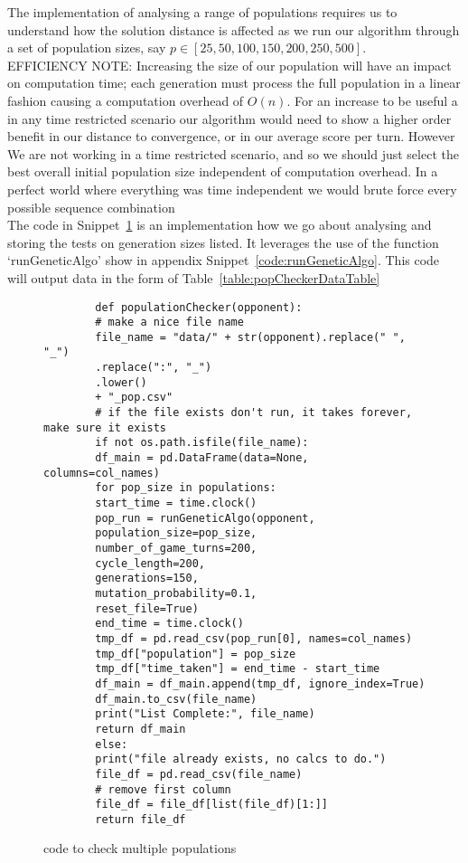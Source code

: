 The implementation of analysing a range of populations requires us to understand how the solution distance is affected as we run our algorithm through a set of population sizes, say \(p \in [25,50,100,150,200,250,500]\).\\

EFFICIENCY NOTE\@: Increasing the size of our population will have an impact on computation time;
each generation must process the full population in a linear fashion causing a computation overhead of \(O(n)\).
For an increase to be useful a in any time restricted scenario our algorithm would need to show a higher order benefit in our distance to convergence, or in our average score per turn.
However We are not working in a time restricted scenario, and so we should just select the best overall initial population size independent of computation overhead.
In a perfect world where everything was time independent we would brute force every possible sequence combination\\

The code in Snippet~\ref{code:populationChecker} is an implementation how we go about analysing and storing the tests on generation sizes listed.
It leverages the use of the function `runGeneticAlgo' show in appendix Snippet~\ref{code:runGeneticAlgo}.
This code will output data in the form of Table~\ref{table:popCheckerDataTable}
\\

\begin{figure}
    \begin{verbatim}
        def populationChecker(opponent):
        # make a nice file name
        file_name = "data/" + str(opponent).replace(" ", "_")
        .replace(":", "_")
        .lower()
        + "_pop.csv"
        # if the file exists don't run, it takes forever, make sure it exists
        if not os.path.isfile(file_name):
        df_main = pd.DataFrame(data=None, columns=col_names)
        for pop_size in populations:
        start_time = time.clock()
        pop_run = runGeneticAlgo(opponent,
        population_size=pop_size,
        number_of_game_turns=200,
        cycle_length=200,
        generations=150,
        mutation_probability=0.1,
        reset_file=True)
        end_time = time.clock()
        tmp_df = pd.read_csv(pop_run[0], names=col_names)
        tmp_df["population"] = pop_size
        tmp_df["time_taken"] = end_time - start_time
        df_main = df_main.append(tmp_df, ignore_index=True)
        df_main.to_csv(file_name)
        print("List Complete:", file_name)
        return df_main
        else:
        print("file already exists, no calcs to do.")
        file_df = pd.read_csv(file_name)
        # remove first column
        file_df = file_df[list(file_df)[1:]]
        return file_df
    \end{verbatim}
    \caption{code to check multiple populations}\label{code:populationChecker}
\end{figure}

